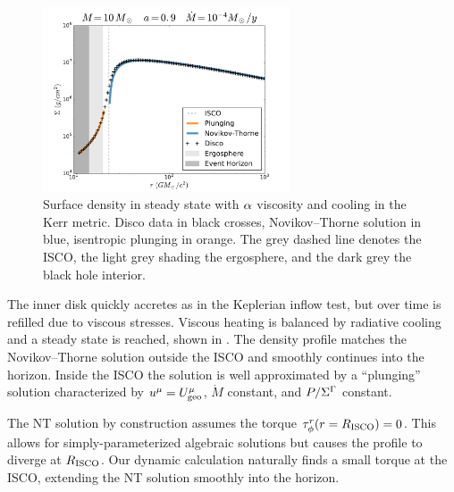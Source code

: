 \begin{figure}
\begin{center}
	\includegraphics[width=0.65\textwidth]{figures/numerics/nt_sig.pdf}
\end{center}
\caption{Surface density in steady state with $\alpha$ viscosity and cooling in the Kerr metric.  Disco data in black crosses, Novikov--Thorne solution in blue, isentropic plunging in orange.  The grey dashed line denotes the ISCO, the light grey shading the ergosphere, and the dark grey the black hole interior.  }
\end{figure}

The inner disk quickly accretes as in the Keplerian inflow test, but over time is refilled due to viscous stresses.  Viscous heating is balanced by radiative cooling and a steady state is reached, shown in .  The density profile matches the Novikov--Thorne solution outside the ISCO and smoothly continues into the horizon.  Inside the ISCO the solution is well approximated by a ``plunging'' solution characterized by $u^\mu = U^\mu_{\rm geo}$, $\dot{M}$ constant, and $P / \Sigma^\Gamma$ constant.  

The NT solution by construction assumes the torque $\tau^r_\phi(r=R_{\rm ISCO}) = 0$.  This allows for simply-parameterized algebraic solutions but causes the profile to diverge at $R_{\rm ISCO}$.  Our dynamic calculation naturally finds a small torque at the ISCO, extending the NT solution smoothly into the horizon.

